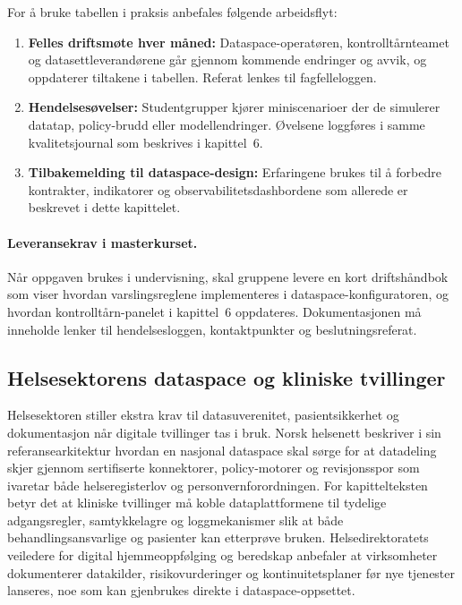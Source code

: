For å bruke tabellen i praksis anbefales følgende arbeidsflyt:
\begin{enumerate}
    \item \textbf{Felles driftsmøte hver måned:} Dataspace-operatøren, kontrolltårnteamet og datasettleverandørene går gjennom
    kommende endringer og avvik, og oppdaterer tiltakene i tabellen. Referat lenkes til fagfelleloggen.
    \item \textbf{Hendelsesøvelser:} Studentgrupper kjører miniscenarioer der de simulerer datatap, policy-brudd eller modellendringer.
    Øvelsene loggføres i samme kvalitetsjournal som beskrives i kapittel~6.
    \item \textbf{Tilbakemelding til dataspace-design:} Erfaringene brukes til å forbedre kontrakter, indikatorer og
    observabilitetsdashbordene som allerede er beskrevet i dette kapittelet.
\end{enumerate}

\paragraph{Leveransekrav i masterkurset.} Når oppgaven brukes i undervisning, skal gruppene levere en kort driftshåndbok som
viser hvordan varslingsreglene implementeres i dataspace-konfiguratoren, og hvordan kontrolltårn-panelet i kapittel~6
oppdateres. Dokumentasjonen må inneholde lenker til hendelsesloggen, kontaktpunkter og beslutningsreferat.

\subsection{Helsesektorens dataspace og kliniske tvillinger}
Helsesektoren stiller ekstra krav til datasuverenitet, pasientsikkerhet og dokumentasjon når digitale tvillinger tas i bruk.
Norsk helsenett beskriver i sin referansearkitektur hvordan en nasjonal dataspace skal sørge for at datadeling skjer gjennom
sertifiserte konnektorer, policy-motorer og revisjonsspor som ivaretar både helseregisterlov og personvernforordningen.\citep{nhn2024dataspace}
For kapittelteksten betyr det at kliniske tvillinger må koble dataplattformene til tydelige adgangsregler, samtykkelagre og
loggmekanismer slik at både behandlingsansvarlige og pasienter kan etterprøve bruken. Helsedirektoratets veiledere for digital
hjemmeoppfølging og beredskap anbefaler at virksomheter dokumenterer datakilder, risikovurderinger og kontinuitetsplaner før
nye tjenester lanseres, noe som kan gjenbrukes direkte i dataspace-oppsettet.\citep{helsedir2020dho,helsedir2023beredskap}

